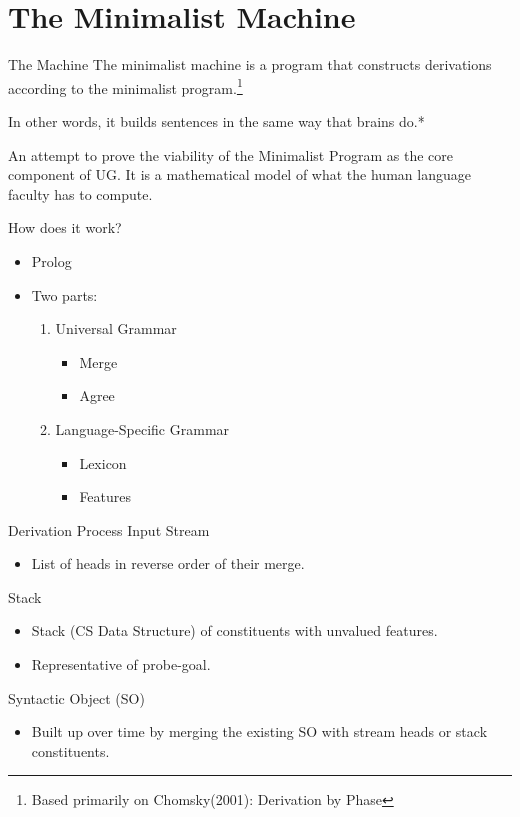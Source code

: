 \documentclass[10pt]{beamer}
\begin{document}
\section{The Minimalist Machine}


\begin{frame}[fragile]{The Machine}
  The minimalist machine is a program that constructs derivations according to the minimalist program.\footnote{Based primarily on Chomsky(2001): Derivation by Phase}
  \pause

  In other words, it builds sentences in the same way that brains do.*
  \pause

  An attempt to prove the viability of the Minimalist Program as the core component of UG. It is a mathematical model of what the human language faculty has to compute. 


\end{frame}


\begin{frame}[fragile]{How does it work?}

  \begin{itemize}[<+->]
    \item Prolog
    \item Two parts:
    \begin{enumerate}[<+->]
      \item Universal Grammar
      \begin{itemize}[<+->]
        \item Merge
        \item Agree
      \end{itemize}
      \item Language-Specific Grammar
      \begin{itemize}[<+->]
        \item Lexicon
        \item Features
      \end{itemize}
    \end{enumerate}
  \end{itemize}

\end{frame}




\begin{frame}[fragile]{Derivation Process}
  \pause
  Input Stream
  \begin{itemize}[<+->]
    \item List of heads in reverse order of their merge.
  \end{itemize}
  Stack
  \begin{itemize}[<+->]
    \item Stack (CS Data Structure) of constituents with unvalued features.
    \item Representative of probe-goal.
  \end{itemize}
  Syntactic Object (SO)
  \begin{itemize}[<+->]
    \item Built up over time by merging the existing SO with stream heads or stack constituents.
  \end{itemize}


\end{frame}
\end{document}
